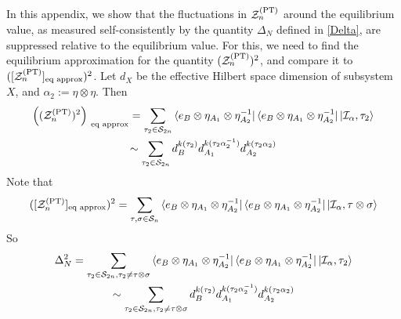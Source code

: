 \documentclass[a4paper,11pt]{article}
\newcommand{\be}{\begin{equation}}
\newcommand{\ee}{\end{equation}}
\newcommand\al{{\alpha}}
\newcommand\sI{{\ensuremath{{\mathcal I}}}}
\newcommand\sS{{\mathcal S}}
\newcommand\sZ{{\mathcal Z}}
\begin{document}
\begin{enumerate}
\begin{appendix}
In this appendix, we show that the fluctuations in $\sZ_n^{\rm(PT)}$ around the equilibrium value, as measured self-consistently by the quantity $\Delta_N$ defined in \eqref{Delta}, are suppressed relative to the equilibrium value. For this, we need to find the equilibrium approximation for the quantity $(\sZ_n^{\rm (PT)})^2$, and compare it to $([\sZ_n^{\rm (PT)}]_{\text{eq approx}})^2$. Let $d_X$ be the effective Hilbert space dimension of subsystem $X$, and $\alpha_2 := \eta \otimes \eta$. Then 
\be 
\begin{gathered} 
\left((\sZ_n^{\rm (PT)})^2\right)_{~\text{eq approx}} = \sum_{\tau_2 \in \sS_{2n}}\bra{e_B \otimes \eta_{A_1}\otimes \eta^{-1}_{A_2}} \bra{e_B \otimes \eta_{A_1}\otimes \eta^{-1}_{A_2}} \ket{\sI_{\al},\tau_2} \\
\sim \sum_{\tau_2 \in \sS_{2n}} d_{B}^{k(\tau_2)}d_{A_1}^{k(\tau_2 \alpha_2^{-1})} d_{A_2}^{k(\tau_2 \alpha_2)}
\end{gathered} 
\ee
Note that 
\be 
([\sZ_n^{\rm(PT)}]_{\text{eq approx}})^2 = \sum_{\tau, \sigma \in \sS_n} \bra{e_B \otimes \eta_{A_1}\otimes \eta^{-1}_{A_2}} \bra{e_B \otimes \eta_{A_1}\otimes \eta^{-1}_{A_2}} \ket{\sI_{\al},\tau \otimes \sigma} 
\ee
So 
\be 
\begin{gathered} 
\Delta_N^2 = \sum_{\tau_2 \in \sS_{2n}, \tau_2 \neq \tau\otimes \sigma} \bra{e_B \otimes \eta_{A_1}\otimes \eta^{-1}_{A_2}} \bra{e_B \otimes \eta_{A_1}\otimes \eta^{-1}_{A_2}} \ket{\sI_{\al},\tau_2} \\
\sim \sum_{\tau_2 \in \sS_{2n}, \tau_2 \neq \tau \otimes \sigma} d_{B}^{k(\tau_2)}d_{A_1}^{k(\tau_2 \alpha_2^{-1})} d_{A_2}^{k(\tau_2 \alpha_2)}
\end{gathered} 
\ee


\end{appendix}
\end{enumerate}
\end{document}

